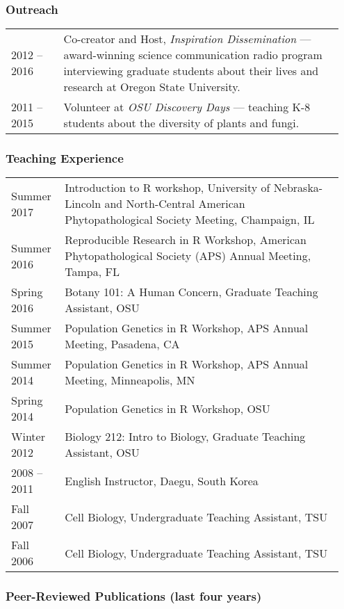 \documentclass[12pt,letterpaper]{article}
\begin{document}
\subsubsection*{Outreach}

\begin{tabular}{p{0.15\linewidth}p{0.8\linewidth}}
2012 -- 2016 & Co-creator and Host, \textit{Inspiration Dissemination} --- 
			   award-winning science communication radio program interviewing 
			   graduate students about their lives and research at Oregon State 
			   University.\\
2011 -- 2015 & Volunteer at \textit{OSU Discovery Days} --- teaching K-8 students
               about the diversity of plants and fungi.
\end{tabular}

\subsubsection*{Teaching Experience}

\begin{tabular}{p{0.15\linewidth}p{0.8\linewidth}}
Summer 2017  & Introduction to R workshop, University of Nebraska-Lincoln and 
			   North-Central American Phytopathological Society Meeting,
			   Champaign, IL\\
Summer 2016  & Reproducible Research in R Workshop, American Phytopathological 
			   Society (APS) Annual Meeting, Tampa, FL\\
Spring 2016  & Botany 101: A Human Concern, Graduate Teaching Assistant, OSU\\
Summer 2015  & Population Genetics in R Workshop, APS Annual Meeting, Pasadena, CA\\
Summer 2014  & Population Genetics in R Workshop, APS Annual Meeting, Minneapolis, MN\\
Spring 2014  & Population Genetics in R Workshop, OSU\\
Winter 2012  & Biology 212: Intro to Biology, Graduate Teaching Assistant, OSU\\
2008 -- 2011 & English Instructor, Daegu, South Korea\\
Fall 2007    & Cell Biology, Undergraduate Teaching Assistant, TSU\\
Fall 2006    & Cell Biology, Undergraduate Teaching Assistant, TSU
\end{tabular}

\newpage

\subsubsection*{Peer-Reviewed Publications (last four years)}
\end{document}
